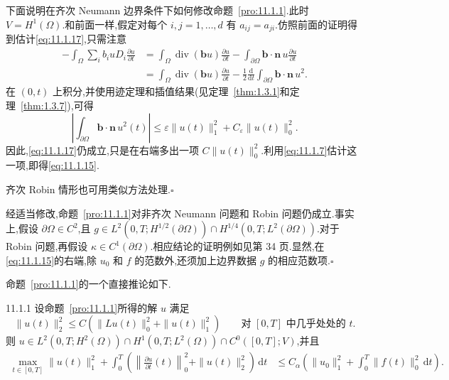 \begin{note}
下面说明在齐次 Neumann 边界条件下如何修改命题~\ref{pro:11.1.1}.此时 \(V=H^1(\Omega)\).和前面一样,假定对每个 \(i,j=1,\ldots,d\) 有 \(a_{ij}=a_{ji}\).仿照前面的证明得到估计\eqref{eq:11.1.17},只需注意
\[
  \begin{aligned}
    -\int_\Omega\sum_i b_i uD_i\frac{\partial u}{\partial t}
      &=\int_\Omega\operatorname{div}(\boldsymbol{b}u)\frac{\partial u}{\partial t}
        -\int_{\partial\Omega}\boldsymbol{b}\cdot\boldsymbol{n}\,u\frac{\partial u}{\partial t}\\
      &=\int_\Omega\operatorname{div}(\boldsymbol{b}u)\frac{\partial u}{\partial t}
        -\frac12\frac{\mathrm d}{\mathrm dt}\int_{\partial\Omega}
                 \boldsymbol{b}\cdot\boldsymbol{n}\,u^2.
  \end{aligned}
\]
在 \((0,t)\) 上积分,并使用迹定理和插值结果(见定理~\ref{thm:1.3.1}和定理~\ref{thm:1.3.7}),可得
\[
  \left|\int_{\partial\Omega}\boldsymbol{b}\cdot\boldsymbol{n}\,u^2(t)\right|
    \le\varepsilon\|u(t)\|_1^2+C_\varepsilon\|u(t)\|_0^2.
\]
因此,\eqref{eq:11.1.17}仍成立,只是在右端多出一项 \(C\|u(t)\|_0^2\).利用\eqref{eq:11.1.7}估计这一项,即得\eqref{eq:11.1.15}.

齐次 Robin 情形也可用类似方法处理.\hfill\(\square\)
\end{note}

\begin{note}
经适当修改,命题~\ref{pro:11.1.1}对非齐次 Neumann 问题和 Robin 问题仍成立.事实上,假设 \(\partial\Omega\in C^2\),且 \(g\in L^2(0,T;H^{1/2}(\partial\Omega))\cap H^{1/4}(0,T;L^2(\partial\Omega))\).对于 Robin 问题,再假设 \(\kappa\in C^1(\partial\Omega)\).相应结论的证明例如见第 34 页.显然,在\eqref{eq:11.1.15}的右端,除 \(u_0\) 和 \(f\) 的范数外,还须加上边界数据 \(g\) 的相应范数项.\hfill\(\square\)
\end{note}

命题~\ref{pro:11.1.1}的一个直接推论如下.

\begin{corollary}[]{11.1.1}
设命题~\ref{pro:11.1.1}所得的解 \(u\) 满足
\begin{equation}\label{eq:11.1.18}
  \|u(t)\|_2^2\le C(\|Lu(t)\|_0^2+\|u(t)\|_1^2)
           \qquad\text{对 }[0,T]\text{ 中几乎处处的 }t.
\end{equation}
则 \(u\in L^2(0,T;H^2(\Omega))\cap H^1(0,T;L^2(\Omega))\cap C^0([0,T];V)\),并且
\begin{equation}\label{eq:11.1.19}
  \begin{aligned}
    \max_{t\in[0,T]}\|u(t)\|_1^2+\int_0^T
      \left(\left\|\frac{\partial u}{\partial t}(t)\right\|_0^2+\|u(t)\|_2^2\right)\,\mathrm dt
      &\le C_\alpha\left(\|u_0\|_1^2+\int_0^T\|f(t)\|_0^2\,\mathrm dt\right).
  \end{aligned}
\end{equation}
\end{corollary}


